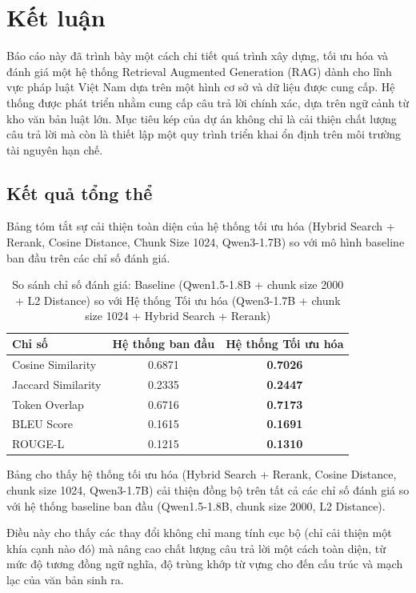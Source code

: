 \section{Kết luận}

Báo cáo này đã trình bày một cách chi tiết quá trình xây dựng, tối ưu hóa và đánh giá một
hệ thống Retrieval Augmented Generation (RAG) dành cho lĩnh vực pháp luật Việt Nam dựa
trên một hình cơ sở và dữ liệu được cung cấp. Hệ thống được phát triển nhằm cung cấp câu trả
lời chính xác, dựa trên ngữ cảnh từ kho văn bản luật lớn. Mục tiêu kép của dự án không chỉ là
cải thiện chất lượng câu trả lời mà còn là thiết lập một quy trình triển khai ổn định trên môi
trường tài nguyên hạn chế.

\subsection{Kết quả tổng thể}

Bảng tóm tắt sự cải thiện toàn diện của hệ thống tối ưu hóa (Hybrid Search + Rerank, Cosine
Distance, Chunk Size 1024, Qwen3-1.7B) so với mô hình baseline ban đầu trên các chỉ số đánh
giá.

\begin{table}[h!]
\centering
\caption{So sánh chỉ số đánh giá: Baseline (Qwen1.5-1.8B + chunk size 2000 + L2 Distance) so
với Hệ thống Tối ưu hóa (Qwen3-1.7B + chunk size 1024 + Hybrid Search + Rerank)}
\begin{tabular}{|l|c|c|}
\hline
\textbf{Chỉ số} & \textbf{Hệ thống ban đầu} & \textbf{Hệ thống Tối ưu hóa} \\
\hline
Cosine Similarity   & 0.6871 & \textbf{0.7026} \\
Jaccard Similarity  & 0.2335 & \textbf{0.2447} \\
Token Overlap       & 0.6716 & \textbf{0.7173} \\
BLEU Score          & 0.1615 & \textbf{0.1691} \\
ROUGE-L             & 0.1215 & \textbf{0.1310} \\
\hline
\end{tabular}
\end{table}

Bảng cho thấy hệ thống tối ưu hóa (Hybrid Search + Rerank, Cosine Distance, chunk size
1024, Qwen3-1.7B) cải thiện đồng bộ trên tất cả các chỉ số đánh giá so với hệ thống baseline
ban đầu (Qwen1.5-1.8B, chunk size 2000, L2 Distance).

Điều này cho thấy các thay đổi không chỉ mang tính cục bộ (chỉ cải thiện một khía cạnh nào
đó) mà nâng cao chất lượng câu trả lời một cách toàn diện, từ mức độ tương đồng ngữ nghĩa,
độ trùng khớp từ vựng cho đến cấu trúc và mạch lạc của văn bản sinh ra.

